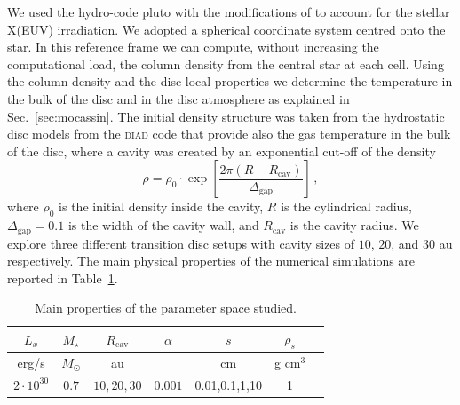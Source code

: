 \documentclass[fleqn,usenatbib]{mnras}
\begin{document}
        We used the hydro-code {\sc pluto} \citep{Mignone2007} with the modifications of \citet{Picogna2019} to account for the stellar X(EUV) irradiation. 
        We adopted a spherical coordinate system centred onto the star.
        In this reference frame we can compute, without increasing the computational load, the column density from the central star at each cell.
        Using the column density and the disc local properties we determine the temperature in the bulk of the disc and in the disc atmosphere as explained in Sec.~\ref{sec:mocassin}.
        The initial density structure was taken from the hydrostatic disc models from the \textsc{diad} code that provide also the gas temperature in the bulk of the disc, where a cavity was created by an exponential cut-off of the density
        \begin{equation}
          \rho = \rho_0 \cdot \exp{\left[\frac{2\pi(R-R_\textrm{cav})}{\Delta_\textrm{gap}}\right]}\,,
        \end{equation}
        where $\rho_0$ is the initial density inside the cavity, $R$ is the cylindrical radius, $\Delta_\textrm{gap} = 0.1$ is the width of the cavity wall, and $R_\textrm{cav}$ is the cavity radius.
        We explore three different transition disc setups with cavity sizes of $10$, $20$, and $30$ au respectively.
        The main physical properties of the numerical simulations are reported in Table~\ref{tab:PlutoPars}.
           
        \begin{table}
        \centering
        \begin{tabular}{c c c c c c c}
         \hline
         $L_x$ & $M_\star$ & $R_\textrm{cav}$ & $\alpha$ & $s$ & $\rho_s$\\ 
         \hline
         erg/s & $M_\odot$ & au & & cm & g cm$^3$\\
         \hline
         $2\cdot 10^{30}$ & $0.7$ & $10, 20, 30$ & $0.001$ & 0.01,0.1,1,10 & 1 \\ 
        \hline
        \end{tabular}
        \caption{\label{tab:PlutoPars} Main properties of the parameter space studied.}
        \end{table}
\end{document}
